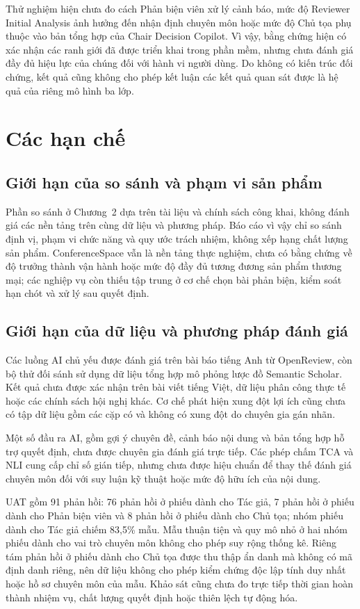 Thử nghiệm hiện chưa đo cách Phản biện viên xử lý cảnh báo, mức độ Reviewer Initial Analysis ảnh hưởng đến nhận định chuyên môn hoặc mức độ Chủ tọa phụ thuộc vào bản tổng hợp của Chair Decision Copilot. Vì vậy, bằng chứng hiện có xác nhận các ranh giới đã được triển khai trong phần mềm, nhưng chưa đánh giá đầy đủ hiệu lực của chúng đối với hành vi người dùng. Do không có kiến trúc đối chứng, kết quả cũng không cho phép kết luận các kết quả quan sát được là hệ quả của riêng mô hình ba lớp.

\section{Các hạn chế}

\subsection{Giới hạn của so sánh và phạm vi sản phẩm}

Phần so sánh ở Chương~2 dựa trên tài liệu và chính sách công khai, không đánh giá các nền tảng trên cùng dữ liệu và phương pháp. Báo cáo vì vậy chỉ so sánh định vị, phạm vi chức năng và quy ước trách nhiệm, không xếp hạng chất lượng sản phẩm. ConferenceSpace vẫn là nền tảng thực nghiệm, chưa có bằng chứng về độ trưởng thành vận hành hoặc mức độ đầy đủ tương đương sản phẩm thương mại; các nghiệp vụ còn thiếu tập trung ở cơ chế chọn bài phản biện, kiểm soát hạn chót và xử lý sau quyết định.

\subsection{Giới hạn của dữ liệu và phương pháp đánh giá}

Các luồng AI chủ yếu được đánh giá trên bài báo tiếng Anh từ OpenReview, còn bộ thử đối sánh sử dụng dữ liệu tổng hợp mô phỏng lược đồ Semantic Scholar. Kết quả chưa được xác nhận trên bài viết tiếng Việt, dữ liệu phân công thực tế hoặc các chính sách hội nghị khác. Cơ chế phát hiện xung đột lợi ích cũng chưa có tập dữ liệu gồm các cặp có và không có xung đột do chuyên gia gán nhãn.

Một số đầu ra AI, gồm gợi ý chuyên đề, cảnh báo nội dung và bản tổng hợp hỗ trợ quyết định, chưa được chuyên gia đánh giá trực tiếp. Các phép chấm TCA và NLI cung cấp chỉ số gián tiếp, nhưng chưa được hiệu chuẩn để thay thế đánh giá chuyên môn đối với suy luận kỹ thuật hoặc mức độ hữu ích của nội dung.

UAT gồm 91 phản hồi: 76 phản hồi ở phiếu dành cho Tác giả, 7 phản hồi ở phiếu dành cho Phản biện viên và 8 phản hồi ở phiếu dành cho Chủ tọa; nhóm phiếu dành cho Tác giả chiếm 83,5\% mẫu. Mẫu thuận tiện và quy mô nhỏ ở hai nhóm phiếu dành cho vai trò chuyên môn không cho phép suy rộng thống kê. Riêng tám phản hồi ở phiếu dành cho Chủ tọa được thu thập ẩn danh mà không có mã định danh riêng, nên dữ liệu không cho phép kiểm chứng độc lập tính duy nhất hoặc hồ sơ chuyên môn của mẫu. Khảo sát cũng chưa đo trực tiếp thời gian hoàn thành nhiệm vụ, chất lượng quyết định hoặc thiên lệch tự động hóa.

